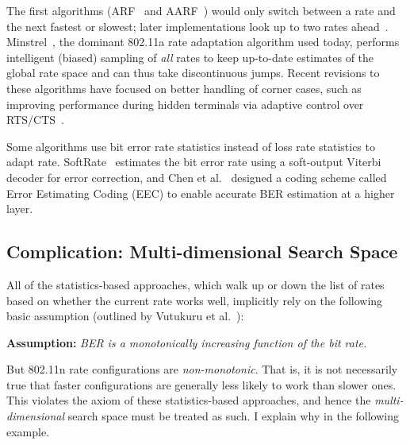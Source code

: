 The first algorithms (ARF~\cite{Kamerman_ARF} and AARF~\cite{Lacage_AARF}) would only switch between a rate and the next fastest or slowest; later implementations look up to two rates ahead~\cite{Bicket_SampleRate}. Minstrel~\cite{Minstrel}, the dominant 802.11a rate adaptation algorithm used today, performs intelligent (biased) sampling of \emph{all} rates to keep up-to-date estimates of the global rate space and can thus take discontinuous jumps. Recent revisions to these algorithms have focused on better handling of corner cases, such as improving performance during hidden terminals via adaptive control over RTS/CTS~\cite{Minstrel,Wong_RRAA}.

Some algorithms use bit error rate statistics instead of loss rate statistics to adapt rate. SoftRate~\cite{Vutukuru_SoftRate} estimates the bit error rate using a soft-output Viterbi decoder for error correction, and Chen et al.~\cite{Chen_EEC} designed a coding scheme called Error Estimating Coding (EEC) to enable accurate BER estimation at a higher layer.

\subsection{Complication: Multi-dimensional Search Space} 
All of the statistics-based approaches, which walk up or down the list of rates based on whether the current rate works well, implicitly rely on the following basic assumption (outlined by Vutukuru et al.~\cite{Vutukuru_SoftRate}):
\begin{center}
\textbf{Assumption:} \emph{BER is a monotonically increasing function of the bit rate.}
\end{center}
But 802.11n rate configurations are \emph{non-monotonic}. That is, it is not necessarily true that faster configurations are generally less likely to work than slower ones. This violates the axiom of these statistics-based approaches, and hence the \emph{multi-dimensional} search space must be treated as such. I explain why in the following example.

